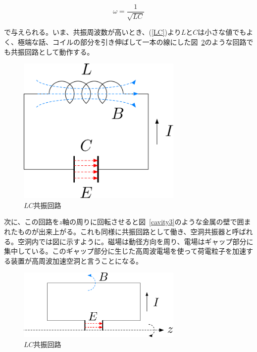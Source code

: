 \documentclass[10pt,a4paper]{ltjsarticle}
\begin{document}
\begin{equation}
  \omega = \frac{1}{\sqrt{LC}}
  \label{LC}
\end{equation}

で与えられる。いま、共振周波数が高いとき、(\ref{LC})より$L$と$C$は小さな値でもよく、極端な話、コイルの部分を引き伸ばして一本の線にした図~\ref{cavity2}のような回路でも共振回路として動作する。

\begin{figure}[hbt]
  \begin{center}
    \includegraphics[width=8cm,clip]{cavity1.pdf}
    \caption{$LC$共振回路}
   \label{cavity1}
  \end{center}
\end{figure}

次に、この回路を$z$軸の周りに回転させると図~\ref{cavity3}のような金属の壁で囲まれたものが出来上がる。これも同様に共振回路として働き、空洞共振器と呼ばれる。空洞内では図に示すように。磁場は動径方向を周り、電場はギャップ部分に集中している。このギャップ部分に生じた高周波電場を使って荷電粒子を加速する装置が高周波加速空洞と言うことになる。

\begin{figure}[hbt]
  \begin{center}
    \includegraphics[width=8cm,clip]{cavity2.pdf}
    \caption{$LC$共振回路}
   \label{cavity2}
  \end{center}
\end{figure}
\end{document}

